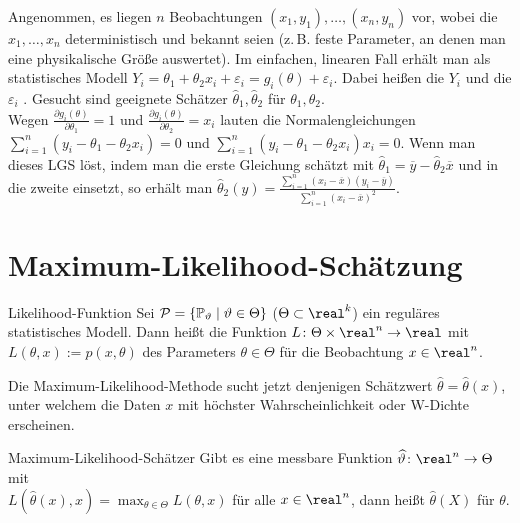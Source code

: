 \begin{Bsp}
    Angenommen, es liegen $n$ Beobachtungen $(x_1, y_1), \dotsc, (x_n, y_n)$ vor, wobei
    die $x_1, \dotsc, x_n$ deterministisch und bekannt seien
    (z.\,B. feste Parameter, an denen man eine physikalische Größe auswertet).
    Im einfachen, linearen Fall erhält man als statistisches Modell
    $Y_i = \theta_1 + \theta_2 x_i + \varepsilon_i = g_i(\theta) + \varepsilon_i$.
    Dabei heißen die $Y_i$  und die $\varepsilon_i$ .
    Gesucht sind geeignete Schätzer $\widehat{\theta}_1, \widehat{\theta}_2$ für
    $\theta_1, \theta_2$.\\
    Wegen $\frac{\partial g_i(\theta)}{\partial \theta_1} = 1$ und
    $\frac{\partial g_i(\theta)}{\partial \theta_2} = x_i$ lauten die Normalengleichungen
    $\sum_{i=1}^n (y_i - \theta_1 - \theta_2 x_i) = 0$ und
    $\sum_{i=1}^n (y_i - \theta_1 - \theta_2 x_i) x_i = 0$.
    Wenn man dieses LGS löst, indem man die erste Gleichung schätzt mit
    $\widehat{\theta}_1 = \overline{y} - \widehat{\theta}_2 \overline{x}$ und in die zweite
    einsetzt, so erhält man
    $\widehat{\theta}_2(y) = \frac{\sum_{i=1}^n (x_i - \overline{x}) (y_i - \overline{y})}
    {\sum_{i=1}^n (x_i - \overline{x})^2}$.
\end{Bsp}


\section{%
    Maximum-Likelihood-Schätzung%
}

\begin{Def}{Likelihood-Funktion}
    Sei $\mathcal{P} = \{\mathbb{P}_\vartheta \;|\; \vartheta \in \Theta\}$ ($\Theta \subset \real^k$) ein
    reguläres statistisches Modell.
    Dann heißt die Funktion $L\colon \Theta \times \real^n \rightarrow \real$ mit
    $L(\theta, x) := p(x, \theta)$  des Parameters $\theta \in \Theta$
    für die Beobachtung $x \in \real^n$.
\end{Def}

\begin{Bem}
    Die Maximum-Likelihood-Methode sucht jetzt denjenigen Schätzwert
    $\widehat{\theta} = \widehat{\theta}(x)$, unter welchem die Daten $x$ mit höchster
    Wahrscheinlichkeit oder W-Dichte erscheinen.
\end{Bem}

\begin{Def}{Maximum-Likelihood-Schätzer}
    Gibt es eine messbare Funktion $\widehat{\theta}\colon \real^n \rightarrow \Theta$ mit\\
    $L(\widehat{\theta}(x), x) = \max_{\theta \in \Theta} L(\theta, x)$ für alle $x \in \real^n$,
    dann heißt $\widehat{\theta}(X)$ 
    für $\theta$.
\end{Def}

